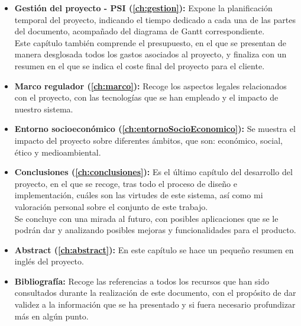 \begin{itemize}
	\item \textbf{Gestión del proyecto - PSI (\autoref{ch:gestion}):} Expone la planificación temporal del proyecto, indicando el tiempo dedicado a cada una de las partes del documento, acompañado del diagrama de Gantt correspondiente. \\ Este capítulo también comprende el presupuesto, en el que se presentan de manera desglosada todos los gastos asociados al proyecto, y finaliza con un resumen en el que se indica el coste final del proyecto para el cliente.
	\item \textbf{Marco regulador (\autoref{ch:marco}):} Recoge los aspectos legales relacionados con el proyecto, con las tecnologías que se han empleado y el impacto de nuestro sistema.
	\item \textbf{Entorno socioeconómico (\autoref{ch:entornoSocioEconomico}):} Se muestra el impacto del proyecto sobre diferentes ámbitos, que son: económico, social, ético y medioambiental.
	\item \textbf{Conclusiones (\autoref{ch:conclusiones}):} Es el último capítulo del desarrollo del proyecto, en el que se recoge, tras todo el proceso de diseño e implementación, cuáles son las virtudes de este sistema, así como mi valoración personal sobre el conjunto de este trabajo. \\ Se concluye con una mirada al futuro, con posibles aplicaciones que se le podrán dar y analizando posibles mejoras y funcionalidades para el producto.
	\item \textbf{Abstract (\autoref{ch:abstract}):} En este capítulo se hace un pequeño resumen en inglés del proyecto.
	\item \textbf{Bibliografía:} Recoge las referencias a todos los recursos que han sido consultados durante la realización de este documento, con el propósito de dar validez a la información que se ha presentado y si fuera necesario profundizar más en algún punto.
\end{itemize}